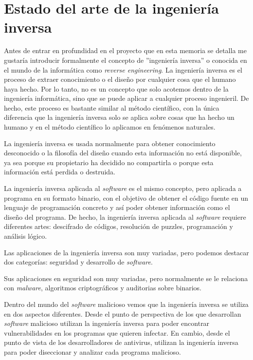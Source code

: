 \chapter{Estado del arte de la ingeniería inversa}
\label{cap:estadoDelArte}


Antes de entrar en profundidad en el proyecto que en esta memoria se detalla me gustaría introducir formalmente el concepto de ''ingeniería inversa'' o conocida en el mundo de la
informática como \textit{reverse engineering}. La ingeniería inversa es el proceso de extraer conocimiento o el diseño por cualquier cosa que el humano haya hecho. Por lo tanto,
no es un concepto que solo acotemos dentro de la ingeniería informática, sino que se puede aplicar a cualquier proceso ingenieril. De hecho, este proceso es bastante similar al
método científico, con la única diferencia que la ingeniería inversa solo se aplica sobre cosas que ha hecho un humano y en el método científico lo aplicamos en fenómenos
naturales.

La ingeniería inversa es usada normalmente para obtener conocimiento desconocido o la filosofía del diseño cuando esta información no está disponible, ya sea porque su propietario
ha decidido no compartirla o porque esta información está perdida o destruida. \cite{alma991003132729706711}

La ingeniería inversa aplicada al \textit{software} es el mismo concepto, pero aplicada a programa en su formato binario, con el objetivo de obtener el código fuente en un lenguaje
de programación concreto y así poder obtener información como el diseño del programa. De hecho, la ingeniería inversa aplicada al \textit{software} requiere diferentes artes:
descifrado de códigos, resolución de puzzles, programación y análisis lógico.

Las aplicaciones de la ingeniería inversa son muy variadas, pero podemos destacar dos categorías: seguridad y desarrollo de \textit{software}.

Sus aplicaciones en seguridad son muy variadas, pero normalmente se le relaciona con \textit{malware}, algoritmos criptográficos y auditorias sobre binarios.

Dentro del mundo del \textit{software} malicioso vemos que la ingeniería inversa se utiliza en dos aspectos diferentes. Desde el punto de perspectiva de los que desarrollan
\textit{software} malicioso utilizan la ingeniería inversa para poder encontrar vulnerabilidades en los programas que quieren infectar. En cambio, desde el punto de vista de los
desarrolladores de antivirus, utilizan la ingeniería inversa para poder diseccionar y analizar cada programa malicioso.


